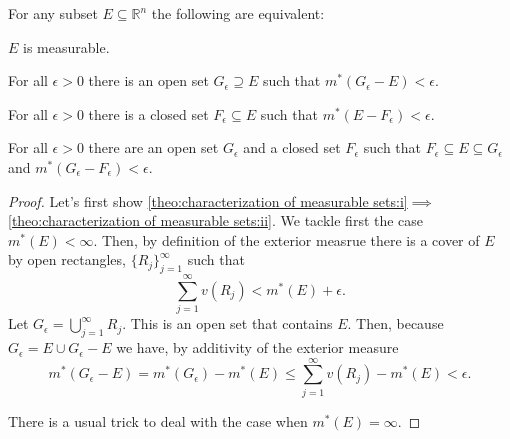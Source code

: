 \documentclass[12pt,oneside]{book}
\newcommand{\locallabel}[1]{\label{\currentprefix:#1}}
\newcommand{\localref}[1]{\ref{\currentprefix:#1}}
\numberwithin{table}{section}
\numberwithin{equation}{section}
\numberwithin{figure}{section}
\newcommand{\R}{\mathbb{R}}
\newcommand{\ext}[1]{m^* \! \left( #1 \right)}
\begin{document}
{
	\def\currentprefix{theo:characterization of measurable sets}
\begin{theorem}
	For any subset \( E \subseteq \R^n \) the following are equivalent:
	\begin{points}
	\item \locallabel{i} \( E \) is measurable.
	\item \locallabel{ii} For all \( \epsilon > 0 \) there is an open set \( G_{\epsilon} \supseteq E \) such that \(  \ext{G_{\epsilon} - E} < \epsilon \).
	\item \locallabel{iii} For all \( \epsilon > 0 \) there is a closed set \( F_{\epsilon} \subseteq E \) such that \(  \ext{E - F_{\epsilon}} < \epsilon \).
	\item \locallabel{iv} For all \( \epsilon > 0 \) there are an open set \( G_{\epsilon} \) and a closed set \( F_{\epsilon} \) such that \( F_{\epsilon} \subseteq E \subseteq G_{\epsilon} \) and \( \ext{G_{\epsilon} - F_{\epsilon}} < \epsilon \).
	\end{points}
\end{theorem}
\begin{proof}
	Let's first show \localref{i}\( \implies \)\localref{ii}. We tackle first the case \( \ext{E} < \infty \). Then, by definition of the exterior measrue there is a cover of \( E \) by open rectangles, \( \{ R_j \}_{j = 1}^\infty \) such that
	\begin{equation*}
		\sum_{j = 1}^{\infty} v(R_j) < \ext{E} + \epsilon.
	\end{equation*}
	Let \( G_\epsilon = \bigcup_{j = 1}^\infty R_j \). This is an open set that contains \( E \). Then, because \( G_\epsilon = E \cup G_\epsilon - E \) we have, by additivity of the exterior measure
	\begin{equation*}
		\ext{G_\epsilon - E} = \ext{G_\epsilon} - \ext{E} \leq \sum_{j = 1}^{\infty}v(R_j) - \ext{E} < \epsilon.
	\end{equation*}

There is a usual trick to deal with the case when \( \ext{E} = \infty \). 
	
\end{proof}
}
\end{document}
